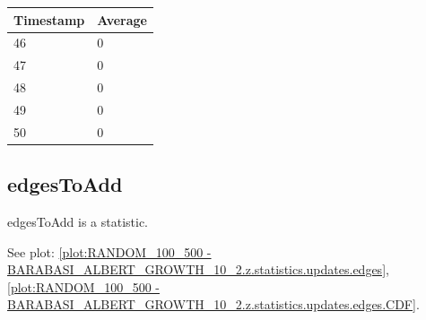 \begin{tabular}{|l||l|}
\hline
	\textbf{Timestamp} & \textbf{Average} \\ \hline
	46 & 0 \\ \hline
	47 & 0 \\ \hline
	48 & 0 \\ \hline
	49 & 0 \\ \hline
	50 & 0 \\ \hline
\end{tabular}

\subsection{edgesToAdd}
edgesToAdd is a statistic.

See plot: \ref{plot:RANDOM_100_500 - BARABASI_ALBERT_GROWTH_10_2.z.statistics.updates.edges}, \ref{plot:RANDOM_100_500 - BARABASI_ALBERT_GROWTH_10_2.z.statistics.updates.edges.CDF}.

